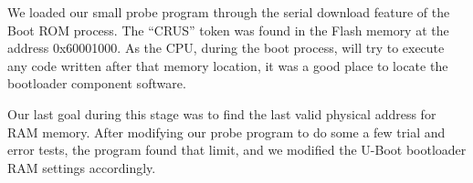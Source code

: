 \documentclass[conference]{IEEEtran}
\newcommand{\nota}[1]{}
\begin{document}
\nota{Para lograr el cometido, enviamos nuestro programa en los 2048 bytes
que el sistema lee desde el arranque vía ``download en serie''.
Nuestro programa leyó bytes
de direcciones consecutivas, comenzando en la dirección 0x60000000 (que
tomamos como referencia del manual de Cirrus).
Encontramos la dirección base de la memoria Flash en 
la dirección 0x60001000, ya que el programa leyó la palabra ``CRUS''
en cuatro bytes consecutivos. Esos cuatro bytes ``CRUS'' indican el inicio
del software de arranque, ya que está especificado en el manual
de la programación del SOC.}

We loaded our small probe program through the serial download feature of 
the Boot ROM process. The ``CRUS'' token was found in the 
Flash memory at the address 0x60001000. As the CPU, during the boot process, will try to
execute any code written 
after that memory location, it was a good place 
to locate the bootloader component software.

\nota{De una manera similar, tuvimos acceso al conocimiento de
las direcciones físicas de la memoria RAM.}

Our last goal during this stage was to find the last valid physical 
address for RAM memory. After modifying our probe program to do some a few trial and error tests, the program found that limit, and we modified the U-Boot bootloader RAM settings accordingly.
\end{document}
